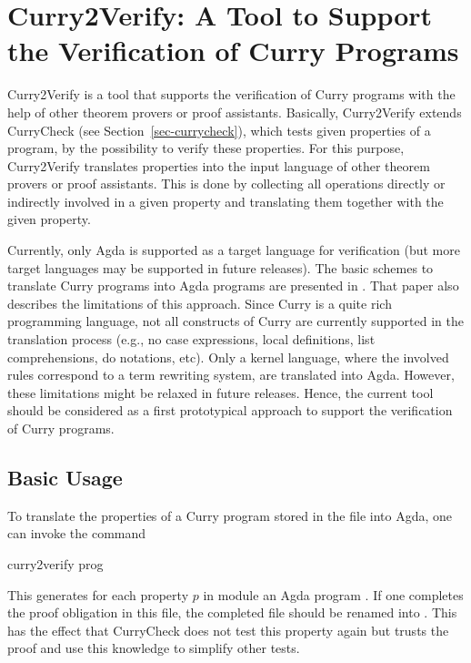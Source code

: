 \section{Curry2Verify: A Tool to Support the Verification of Curry Programs}
\label{sec-curry2verify}

Curry2Verify
is a tool that supports the verification of Curry programs
with the help of other theorem provers or proof assistants.
Basically, Curry2Verify extends CurryCheck (see Section~\ref{sec-currycheck}),
which tests given properties of a program,
by the possibility to verify these properties.
For this purpose, Curry2Verify translates properties
into the input language of other theorem provers or proof assistants.
This is done by collecting all operations directly or indirectly
involved in a given property and translating them together with
the given property.

Currently, only Agda \cite{Norell09} is supported as
a target language for verification (but more target languages
may be supported in future releases).
The basic schemes to translate Curry programs into Agda programs
are presented in \cite{AntoyHanusLibby16}.
That paper also describes the limitations of this approach.
Since Curry is a quite rich programming language,
not all constructs of Curry are currently supported
in the translation process (e.g., no case expressions,
local definitions, list comprehensions, do notations, etc).
Only a kernel language, where the involved rules
correspond to a term rewriting system, are translated into Agda.
However, these limitations might be relaxed in future releases.
Hence, the current tool should be considered as a first prototypical
approach to support the verification of Curry programs.

\subsection{Basic Usage}

To translate the properties of a Curry program stored
in the file  into Agda,
one can invoke the command
%
\begin{curry}
curry2verify prog
\end{curry}
%
This generates for each property $p$ in module 
an Agda program .
If one completes the proof obligation in this file,
the completed file should be renamed into
.
This has the effect that CurryCheck does not test this property again
but trusts the proof and use this knowledge to simplify other tests.

